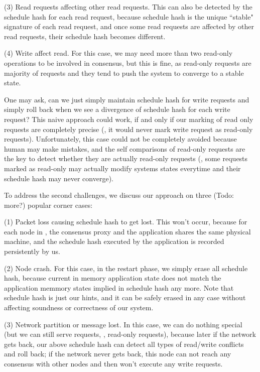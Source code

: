 (3) Read requests affecting other read requests. This can also be detected by 
the schedule hash for each read request, because schedule hash is the unique ``stable" 
signature of each read request, and once some read requests are affected by 
other read requests, their schedule hash becomes different.

(4) Write affect read. For this case, we may need more than two read-only 
operations to be involved in consensus, but this is fine, as read-only requests 
are majority of requests and they tend to push the system to converge to a 
stable state.

One may ask, can we just simply maintain schedule hash for write requests and 
simply roll back when we see a divergence of schedule hash for each write 
request? This naive approach could work, if and only if our marking of read 
only requests are completely precise (\ie, it would never mark write request as 
read-only requests). Unfortunately, this case could not be completely avoided 
because human may make mistakes, and the self comparisons of read-only requests 
are the key to detect whether they are actually read-only requests (\eg, some 
requests marked as read-only may actually modify systems states everytime and 
their schedule hash may never converge).

To address the second challenges, we discuss our approach on three (Todo: more?) popular 
corner cases:

(1) Packet loss causing schedule hash to get lost. This won't occur, because 
for each node in \msmr, the consensus proxy and the application shares the same 
physical machine, and the schedule hash executed by the application is recorded 
persistently by us.

(2) Node crash. For this case, in the restart phase, we simply erase all 
schedule hash, because current in memory application state does not match the 
application memmory states implied in schedule hash any more. Note that 
schedule hash is just our hints, and it can be safely erased in any case 
without affecting soundness or correctness of our system.

(3) Network partition or \paxos message lost. In this case, we can do nothing 
special (but we can still serve requests, \eg, read-only requests), because 
later if the network gets back, our above schedule hash can detect all types of 
read/write conflicts and roll back; if the network never gets back, this node 
can not reach any consensus with other nodes and then won't execute any write 
requests.

